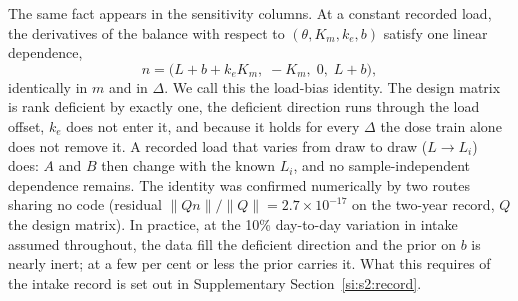 The same fact appears in the sensitivity columns. At a constant recorded load, the
derivatives of the balance with respect to $(\theta,K_m,k_e,b)$ satisfy one linear
dependence,
\begin{equation}
\label{seq:s1-nullvec}
n=\bigl(L+b+k_eK_m,\;-K_m,\;0,\;L+b\bigr),
\end{equation}
identically in $m$ and in $\Delta$. We call this the load-bias identity. The design matrix
is rank deficient by exactly one, the deficient direction runs through the load offset,
$k_e$ does not enter it, and because it holds for every $\Delta$ the dose train alone does
not remove it. A recorded load that varies from draw to draw ($L\to L_i$) does: $A$ and $B$
then change with the known $L_i$, and no sample-independent dependence remains. The
identity was confirmed numerically by two routes sharing no code (residual
$\lVert Qn\rVert/\lVert Q\rVert=2.7\times10^{-17}$ on the two-year record, $Q$ the design
matrix). In practice, at the 10\% day-to-day variation in intake assumed throughout, the
data fill the deficient direction and the prior on $b$ is nearly inert; at a few per cent
or less the prior carries it. What this requires of the intake record is set out in
Supplementary Section~\ref{si:s2:record}.

